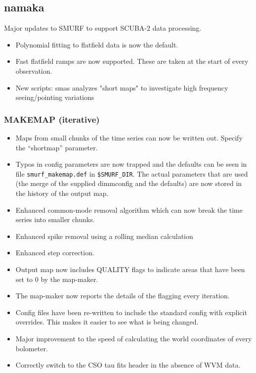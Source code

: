 \documentclass[oneside,11pt]{starlink}
\begin{document}
\subsection{namaka}

Major updates to SMURF to support SCUBA-2 data processing.

\begin{itemize}
\item Polynomial fitting to flatfield data is now the default.
\item Fast flatfield ramps are now supported. These are taken at the
  start of every observation.
\item New scripts: smas analyzes "short maps" to investigate high
  frequency seeing/pointing variations
\end{itemize}

\subsubsection{MAKEMAP (iterative)}

\begin{itemize}
\item Maps from small chunks of the time series can now be written
  out. Specify the ``shortmap'' parameter.
\item Typos in config parameters are now trapped and the defaults can
  be seen in file \texttt{smurf\_makemap.def} in
  \texttt{\$SMURF\_DIR}. The actual parameters that are used (the
  merge of the supplied dimmconfig and the defaults) are now stored in
  the history of the output map.
\item Enhanced common-mode removal algorithm which can now break the
  time series into smaller chunks.
\item Enhanced spike removal using a rolling median calculation
\item Enhanced step correction.
\item Output map now includes QUALITY flags to indicate areas that
  have been set to 0 by the map-maker.
\item The map-maker now reports the details of the flagging every iteration.
\item Config files have been re-written to include the standard config
  with explicit overrides. This makes it easier to see what is being
  changed.
\item Major improvement to the speed of calculating the world
  coordinates of every bolometer.
\item Correctly switch to the CSO tau fits header in the absence of WVM data.
\end{itemize}
\end{document}
